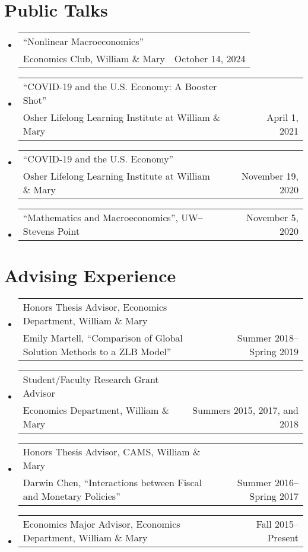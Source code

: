 \documentclass[10pt,letterpaper,en-US]{article}
\makeatletter
\newcommand{\itemrow}[2]
{\begin{tabular*}{\linewidth}{l@{\extracolsep{\fill}}r}
	#1 & #2 \\
\end{tabular*}}
\makeatother
\begin{document}
\section*{Public Talks}
\begin{itemize}
    \item \itemrow{``Nonlinear Macroeconomics'' \\ Economics Club, William \& Mary}{October 14, 2024}
    \item \itemrow{``COVID-19 and the U.S. Economy: A Booster Shot'' \\ Osher Lifelong Learning Institute at William \& Mary}{April 1, 2021}
    \item \itemrow{``COVID-19 and the U.S. Economy'' \\ Osher Lifelong Learning Institute at William \& Mary}{November 19, 2020}
    \item \itemrow{``Mathematics and Macroeconomics'', UW--Stevens Point}{November 5, 2020}
\end{itemize}

\section*{Advising Experience}
\begin{itemize}
    \item \itemrow{Honors Thesis Advisor, Economics Department, William \& Mary  \\
    Emily Martell, ``Comparison of Global Solution Methods to a ZLB Model''}{Summer 2018--Spring 2019}
    \item \itemrow{Student/Faculty Research Grant Advisor \\
     Economics Department, William \& Mary}{Summers 2015, 2017, and 2018}
    \item \itemrow{Honors Thesis Advisor, CAMS, William \& Mary  \\
    Darwin Chen, ``Interactions between Fiscal and Monetary Policies''}{Summer 2016--Spring 2017}
    \item \itemrow{Economics Major Advisor, Economics Department, William \& Mary}{Fall 2015--Present}
\end{itemize}

\newpage
\end{document}
